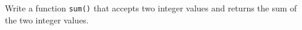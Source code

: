 Write a function \texttt{sum()} that accepts two integer values and returns the sum of the two integer values.

